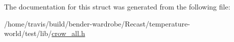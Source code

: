 The documentation for this struct was generated from the following file\-:\begin{DoxyCompactItemize}
\item 
/home/travis/build/bender-\/wardrobe/\-Recast/temperature-\/world/test/lib/\hyperlink{crow__all_8h}{crow\-\_\-all.\-h}\end{DoxyCompactItemize}

